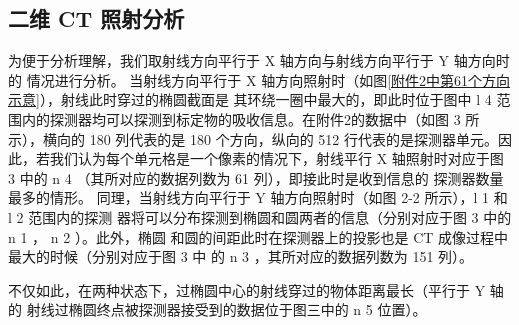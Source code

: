 \documentclass[bwprint]{cumcmthesis}
\begin{document}
\subsection{二维 CT 照射分析}
为便于分析理解，我们取射线方向平行于 X 轴方向与射线方向平行于 Y 轴方向时的 情况进行分析。
当射线方向平行于 X 轴方向照射时（如图\ref{附件2中第61个方向示意}），射线此时穿过的椭圆截面是 其环绕一圈中最大的，即此时位于图中 l 4 范围内的探测器均可以探测到标定物的吸收信息。在附件2的数据中（如图 3 所示），横向的 180 列代表的是 180 个方向，纵向的 512 行代表的是探测器单元。因此，若我们认为每个单元格是一个像素的情况下，射线平行 X 轴照射时对应于图 3 中的 n 4 （其所对应的数据列数为 61 列），即接此时是收到信息的 探测器数量最多的情形。
同理，当射线方向平行于 Y 轴方向照射时（如图 2-2 所示），l 1 和 l 2 范围内的探测 器将可以分布探测到椭圆和圆两者的信息（分别对应于图 3 中的 n 1 ， n 2 ）。此外，椭圆 和圆的间距此时在探测器上的投影也是 CT 成像过程中最大的时候（分别对应于图 3 中 的 n 3 ，其所对应的数据列数为 151 列）。

不仅如此，在两种状态下，过椭圆中心的射线穿过的物体距离最长（平行于 Y 轴的 射线过椭圆终点被探测器接受到的数据位于图三中的 n 5 位置）。

\end{document}
